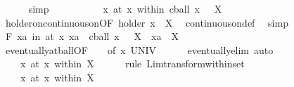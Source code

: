 \begin{isabellebody}
\ {\isacartoucheopen}{}\ {\isacharless}{\kern0pt}\ {\isasymepsilon}{\isacartoucheclose}\ \isamarkupfalse%
\ simp\isanewline
\ \ \ \ \isamarkupfalse%
\ \isamarkupfalse%
\ {\isachardoublequoteopen}{\isacharparenleft}{\kern0pt}{\isasymphi}\ {\isasymlonglongrightarrow}\ {\isasymphi}\ x{\isacharparenright}{\kern0pt}\ {\isacharparenleft}{\kern0pt}at\ x\ within\ cball\ x\ {\isasymepsilon}\ {\isasyminter}\ X{\isacharparenright}{\kern0pt}{\isachardoublequoteclose}\isanewline
\ \ \ \ \ \ \isamarkupfalse%
\ holder{\isacharunderscore}{\kern0pt}on{\isacharunderscore}{\kern0pt}continuous{\isacharunderscore}{\kern0pt}on{\isacharbrackleft}{\kern0pt}OF\ holder{\isacharbrackright}{\kern0pt}\ {\isacartoucheopen}x\ {\isasymin}\ X{\isacartoucheclose}\ \isamarkupfalse%
\ continuous{\isacharunderscore}{\kern0pt}on{\isacharunderscore}{\kern0pt}def\ \isamarkupfalse%
\ simp\isanewline
\ \ \ \isamarkupfalse%
\ \isamarkupfalse%
\ {\isachardoublequoteopen}{\isasymforall}\isactrlsub F\ xa\ in\ at\ x{\isachardot}{\kern0pt}\ {\isacharparenleft}{\kern0pt}xa\ {\isasymin}\ cball\ x\ {\isasymepsilon}\ {\isasyminter}\ X{\isacharparenright}{\kern0pt}\ {\isacharequal}{\kern0pt}\ {\isacharparenleft}{\kern0pt}xa\ {\isasymin}\ X{\isacharparenright}{\kern0pt}{\isachardoublequoteclose}\isanewline
\ \ \ \ \isamarkupfalse%
\ eventually{\isacharunderscore}{\kern0pt}at{\isacharunderscore}{\kern0pt}ball{\isacharbrackleft}{\kern0pt}OF\ {\isacartoucheopen}{}\ {\isacharless}{\kern0pt}\ {\isasymepsilon}{\isacartoucheclose}{\isacharcomma}{\kern0pt}\ of\ x\ UNIV{\isacharbrackright}{\kern0pt}\isanewline
\ \ \ \ \isamarkupfalse%
\ eventually{\isacharunderscore}{\kern0pt}elim\ auto\isanewline
\ \ \isamarkupfalse%
\ \isamarkupfalse%
\ {\isachardoublequoteopen}{\isacharparenleft}{\kern0pt}{\isasymphi}\ {\isasymlonglongrightarrow}\ {\isasymphi}\ x{\isacharparenright}{\kern0pt}\ {\isacharparenleft}{\kern0pt}at\ x\ within\ X{\isacharparenright}{\kern0pt}{\isachardoublequoteclose}\isanewline
\ \ \ \ \isamarkupfalse%
\ {\isacharparenleft}{\kern0pt}rule\ Lim{\isacharunderscore}{\kern0pt}transform{\isacharunderscore}{\kern0pt}within{\isacharunderscore}{\kern0pt}set{\isacharparenright}{\kern0pt}\isanewline
\ \ \isacommand{{\isacharbraceright}{\kern0pt}}\isamarkupfalse%
\isanewline
\ \ \isamarkupfalse%
\ \isamarkupfalse%
\ {\isachardoublequoteopen}{\isacharparenleft}{\kern0pt}{\isasymphi}\ {\isasymlonglongrightarrow}\ {\isasymphi}\ x{\isacharparenright}{\kern0pt}\ {\isacharparenleft}{\kern0pt}at\ x\ within\ X{\isacharparenright}{\kern0pt}{\isachardoublequoteclose}\isanewline

\end{isabellebody}
